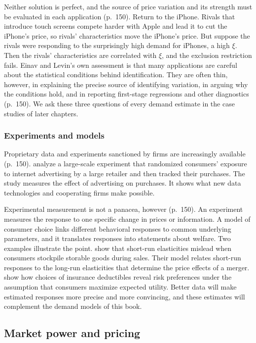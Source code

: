 Neither solution is perfect, and the source of price variation and its strength must be evaluated in each
application (p.~150). Return to the iPhone. Rivals that introduce touch screens compete harder with Apple and
lead it to cut the iPhone's price, so rivals' characteristics move the iPhone's price. But suppose the rivals
were responding to the surprisingly high demand for iPhones, a high $\xi$. Then the rivals' characteristics
are correlated with $\xi$, and the exclusion restriction fails. Einav and Levin's own assessment is that many
applications are careful about the statistical conditions behind identification. They are often thin,
however, in explaining the precise source of identifying variation, in arguing why the conditions hold, and
in reporting first-stage regressions and other diagnostics (p.~150). We ask these three questions of every
demand estimate in the case studies of later chapters.

\subsubsection{Experiments and models}

Proprietary data and experiments sanctioned by firms are increasingly available (p.~150).
\citet{LewisReiley2009} analyze a large-scale experiment that randomized consumers' exposure to internet
advertising by a large retailer and then tracked their purchases. The study measures the effect of
advertising on purchases. It shows what new data technologies and cooperating firms make possible.

Experimental measurement is not a panacea, however (p.~150). An experiment measures the response to one
specific change in prices or information. A model of consumer choice links different behavioral responses to
common underlying parameters, and it translates responses into statements about welfare. Two examples
illustrate the point. \citet{HendelNevo2006} show that short-run elasticities mislead when consumers stockpile
storable goods during sales. Their model relates short-run responses to the long-run elasticities that
determine the price effects of a merger. \citet{CohenEinav2007} show how choices of insurance deductibles
reveal risk preferences under the assumption that consumers maximize expected utility. Better data will make
estimated responses more precise and more convincing, and these estimates will complement the demand models
of this book.

\subsection{Market power and pricing}\label{sec:01-today-pricing}

